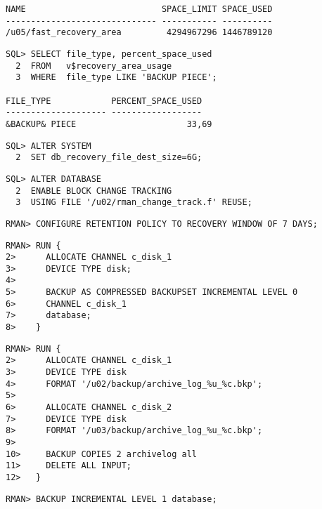 \begin{enumerate}
\begin{lstlisting}[language=oracle_sql]
NAME                           SPACE_LIMIT SPACE_USED
------------------------------ ----------- ----------
/u05/fast_recovery_area         4294967296 1446789120
    \end{lstlisting}
    
    \begin{lstlisting}[language=oracle_sql]
SQL> SELECT file_type, percent_space_used
  2  FROM   v$recovery_area_usage
  3  WHERE  file_type LIKE 'BACKUP PIECE';

FILE_TYPE            PERCENT_SPACE_USED
-------------------- ------------------
&BACKUP& PIECE                      33,69
    \end{lstlisting}
    
    \begin{lstlisting}[language=oracle_sql]
SQL> ALTER SYSTEM
  2  SET db_recovery_file_dest_size=6G;
    \end{lstlisting}
    
      \begin{lstlisting}[caption={Block Change Tracking aktivieren},language=oracle_sql]
SQL> ALTER DATABASE
  2  ENABLE BLOCK CHANGE TRACKING
  3  USING FILE '/u02/rman_change_track.f' REUSE;
      \end{lstlisting}
      \begin{lstlisting}[caption={Retention Policy setzen},language=rman]
RMAN> CONFIGURE RETENTION POLICY TO RECOVERY WINDOW OF 7 DAYS;
      \end{lstlisting}
      \begin{lstlisting}[caption={\oscommand{backup\_sunday\_level\_0.cmd}},language=rman]
RMAN> RUN {
2>      ALLOCATE CHANNEL c_disk_1
3>      DEVICE TYPE disk;
4>
5>      BACKUP AS COMPRESSED BACKUPSET INCREMENTAL LEVEL 0 
6>      CHANNEL c_disk_1
7>      database;
8>    }
      \end{lstlisting}
      \begin{lstlisting}[caption={\oscommand{backup\_archive\_log.cmd}},language=rman]
RMAN> RUN {
2>      ALLOCATE CHANNEL c_disk_1
3>      DEVICE TYPE disk
4>      FORMAT '/u02/backup/archive_log_%u_%c.bkp';
5>
6>      ALLOCATE CHANNEL c_disk_2
7>      DEVICE TYPE disk
8>      FORMAT '/u03/backup/archive_log_%u_%c.bkp';
9>
10>     BACKUP COPIES 2 archivelog all
11>     DELETE ALL INPUT;
12>   }
      \end{lstlisting}
      \begin{lstlisting}[caption={\oscommand{backup\_mon\_tue\_thu\_fri.cmd}},language=rman]
RMAN> BACKUP INCREMENTAL LEVEL 1 database;
      \end{lstlisting}

\end{enumerate}
